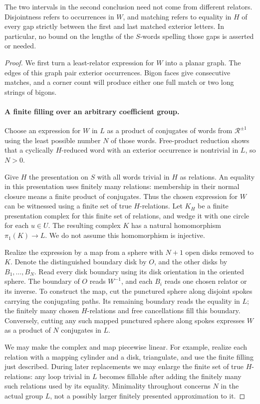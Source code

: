The two intervals in the second conclusion need not come from different
relators.  Disjointness refers to occurrences in $W$, and matching refers
to equality in $H$ of every gap strictly between the first and last
matched exterior letters.  In particular, no bound on the lengths of the
$S$-words spelling those gaps is asserted or needed.

\begin{proof}
We first turn a least-relator expression for $W$ into a planar graph.
The edges of this graph pair exterior occurrences.  Bigon faces give
consecutive matches, and a corner count will produce either one full
match or two long strings of bigons.

\paragraph{A finite filling over an arbitrary coefficient group.}
Choose an expression for $W$ in $L$ as a product of conjugates of words
from $\mathcal R^{\pm1}$ using the least possible number $N$ of those
words.  Free-product reduction shows that a cyclically $H$-reduced word
with an exterior occurrence is nontrivial in $L$, so $N>0$.

Give $H$ the presentation on $S$ with all words trivial in $H$ as
relations.  An equality in this presentation uses finitely many
relations: membership in their normal closure means a finite product
of conjugates.  Thus the chosen expression for $W$ can be witnessed
using a finite set of true $H$-relations.  Let $K_H$ be a finite
presentation complex for this finite set of relations, and wedge it
with one circle for each $u\in U$.  The resulting complex $K$ has a
natural homomorphism $\pi_1(K)\to L$.  We do not assume this homomorphism
is injective.

Realize the expression by a map from a sphere with $N+1$ open disks
removed to $K$.  Denote the distinguished boundary disk by $O$, and the
other disks by $B_1,\ldots,B_N$.  Read every disk boundary using its disk
orientation in the oriented sphere.  The boundary of $O$ reads $W^{-1}$,
and each $B_i$ reads one chosen relator or its inverse.  To construct the
map, cut the punctured sphere along disjoint spokes carrying the
conjugating paths.  Its remaining boundary reads the equality in $L$;
the finitely many chosen $H$-relations and free cancellations fill this
boundary.  Conversely, cutting any such mapped punctured sphere along
spokes expresses $W$ as a product of $N$ conjugates in $L$.

We may make the complex and map piecewise linear.  For example, realize
each relation with a mapping cylinder and a disk, triangulate, and use
the finite filling just described.  During later replacements we may
enlarge the finite set of true $H$-relations: any loop trivial in $L$
becomes fillable after adding the finitely many such relations used by
its equality.  Minimality throughout concerns $N$ in the actual group
$L$, not a possibly larger finitely presented approximation to it.


\end{proof}
